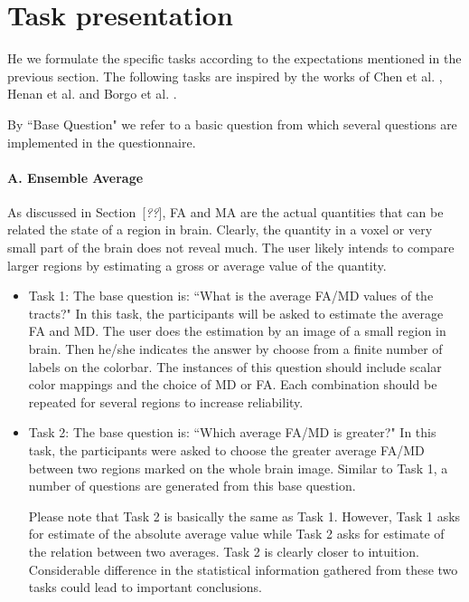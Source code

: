 \documentclass[a4paper, 12pt]{report}
\newcommand{\comment}[1]{{\color{red}[\textit{#1}]}}
\begin{document}
\section{Task presentation}
He we formulate the specific tasks according to the expectations mentioned in the previous section. The following tasks are inspired by the works of Chen et al. \cite{chen}, Henan et al. \cite{henan} and Borgo et al. \cite{borgo}.

By ``Base Question" we refer to a basic question from which several questions are implemented in the questionnaire.

\paragraph{A. Ensemble Average}

As discussed in Section~\comment{??}, FA and MA are the actual quantities that can be related the state of a region in brain. Clearly, the quantity in a voxel or very small part of the brain does not reveal much. The user likely intends to compare larger regions by estimating a gross or average value of the quantity.
\begin{itemize}
	\item{Task 1:} The base question is: ``What is the average FA/MD values of the tracts?"
	In this task, the participants will be asked to estimate the average FA and MD. The user does the estimation by an image of a small region in brain. Then he/she indicates the answer by choose from a finite number of labels on the colorbar. The instances of this question should include scalar color mappings and the choice of MD or FA. Each combination should be repeated for several regions to increase reliability. 
	
	
	\item{Task 2:} The base question is: ``Which average FA/MD is greater?" 
	In this task, the participants were asked to choose the greater average FA/MD between two regions marked on the whole brain image. Similar to Task 1, a number of questions are generated from this base question. 
	
Please note that Task 2 is basically the same as Task 1. However, Task 1 asks for estimate of the absolute average value  while Task 2 asks for estimate of the relation between two averages. Task 2 is clearly closer to intuition. Considerable difference in the statistical information gathered from these two tasks could lead to important conclusions.
	
\end{itemize}
\end{document}
